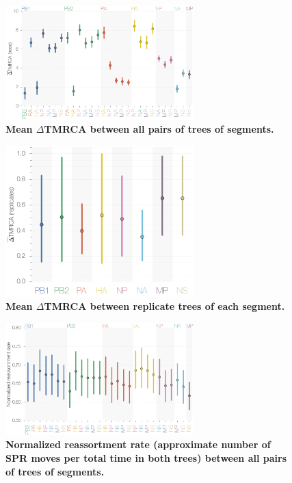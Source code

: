 \documentclass[11pt,oneside,letterpaper]{article}
\begin{document}
\begin{figure}
\centering  
\includegraphics[width=0.65\textwidth]  {supp_figures/InfB_supp_deltaTMRCA_trees.png}
\caption{\textbf{Mean $\Delta$TMRCA between all pairs of trees of segments.}}
\label{deltaTMRCAtrees}
\end{figure}

\begin{figure}
\centering  
\includegraphics[width=0.65\textwidth]  {supp_figures/InfB_supp_deltaTMRCA_replicates.png}
\caption{\textbf{Mean $\Delta$TMRCA between replicate trees of each segment.}}
\label{deltaTMRCAreplicates}
\end{figure}

\begin{figure}
\centering  
\includegraphics[width=0.65\textwidth]  {supp_figures/InfB_supp_normRErate.png}
\caption{\textbf{Normalized reassortment rate (approximate number of SPR moves per total time in both trees) between all pairs of trees of segments.}}
\label{NormSPR_RErate}
\end{figure}
\end{document}

